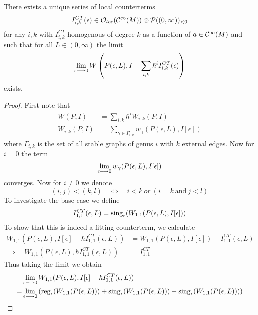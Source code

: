 \begin{theo}
  There exists a unique series of local counterterms
  \begin{equation}I_{i,k}^{CT}(\epsilon) \in \OO_{loc}(\Ci(M)) \otimes \mathcal{P}((0,\infty))_{<0}\end{equation}
  for any $i,k$ with $I_{i,k}^{CT}$ homogenous of degree $k$ as a function of $a \in \mathcal{C}^{\infty}(M)$ and such that for all $L \in (0,\infty)$ the limit
  \begin{equation}\lim_{\epsilon \lra 0} W\left(P(\epsilon, L), I - \sum_{i,k} \hbar^i I_{i,k}^{CT}(\epsilon)\right)\end{equation}
  exists.
\begin{proof}
  First note that
  \begin{align}
    W(P,I) &= \sum_{i,k} \hbar^i W_{i,k}(P,I) \\
    W_{i,k}(P,I) &= \sum_{\gamma \in \Gamma_{i,k}} w_\gamma (P(\epsilon, L), I[\epsilon])
  \end{align}
  where $\Gamma_{i,k}$ is the set of all stable graphs of genus $i$ with $k$ external edges. Now for $i = 0$ the term
  \begin{equation}\lim_{\epsilon \lra 0} w_\gamma (P(\epsilon, L), I[\epsilon])\end{equation}
  converges. Now for $i\neq 0$ we denote
  \begin{equation}(i,j) < (k,l) \quad \Leftrightarrow \quad i<k \ or \ (i=k \ \text{and} \ j<l)\end{equation}
  To investigate the base case we define
  \begin{equation}I_{1,1}^{CT}(\epsilon, L) = \sing_\epsilon(W_{1,1}(P(\epsilon, L), I[\epsilon]))\end{equation}
  To show that this is indeed a fitting counterterm, we calculate
  \begin{align}
    W_{1,1}(P(\epsilon,L), I[\epsilon] - \hbar I_{1,1}^{CT}(\epsilon,L)) &= W_{1,1}(P(\epsilon,L), I[\epsilon]) - I_{1,1}^{CT}(\epsilon,L)\\
    \Rightarrow \quad W_{1,1}(P(\epsilon,L), \hbar I_{1,1}^{CT}(\epsilon,L)) &= I_{1,1}^{CT}
  \end{align}
  Thus taking the limit we obtain
  \begin{align}
    &\lim_{\epsilon \lra 0} W_{1,1}(P(\epsilon,L), I[\epsilon] - \hbar I_{1,1}^{CT}(\epsilon,L)) \\
    = &\lim_{\epsilon \lra 0} \left( \reg_\epsilon(W_{1,1}(P(\epsilon,L))) + \sing_\epsilon(W_{1,1}(P(\epsilon,L))) - \sing_\epsilon(W_{1,1}(P(\epsilon,L))) \right)

\end{align}
\end{proof}
\end{theo}
